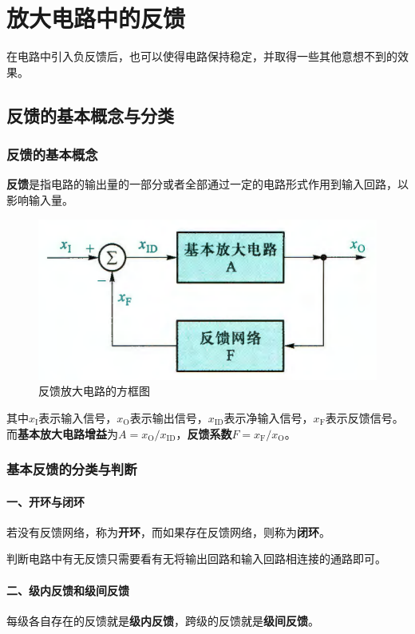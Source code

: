 \chapter{放大电路中的反馈}
在电路中引入负反馈后，也可以使得电路保持稳定，并取得一些其他意想不到的效果。
\section{反馈的基本概念与分类}
\subsection{反馈的基本概念}
\textbf{反馈}是指电路的输出量的一部分或者全部通过一定的电路形式作用到输入回路，以影响输入量。
\begin{figure}[htb]
    \centering
    \includegraphics[width=0.5\linewidth]{pic/反馈.png}
    \caption{反馈放大电路的方框图\cite{康华光}\label{反馈}}
\end{figure}

其中$x_{\mathrm{I}}$表示输入信号，$x_{\mathrm{O}}$表示输出信号，$x_{\mathrm{ID}}$表示净输入信号，$x_{\mathrm{F}}$表示反馈信号。而\textbf{基本放大电路增益}为$A=x_{\mathrm{O}}/x_{\mathrm{ID}}$，\textbf{反馈系数}$F=x_{\mathrm{F}}/x_{\mathrm{O}}$。

\subsection{基本反馈的分类与判断}\label{基本反馈的分类与判断}
\subsubsection{一、开环与闭环}
若没有反馈网络，称为\textbf{开环}，而如果存在反馈网络，则称为\textbf{闭环}。

判断电路中有无反馈只需要看有无将输出回路和输入回路相连接的通路即可。

\subsubsection{二、级内反馈和级间反馈}
每级各自存在的反馈就是\textbf{级内反馈}，跨级的反馈就是\textbf{级间反馈}。

